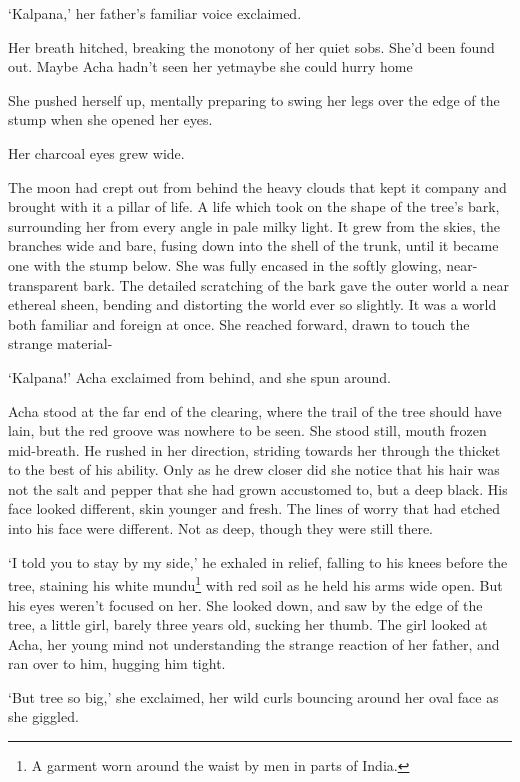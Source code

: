 `Kalpana,' her father's familiar voice exclaimed.

Her breath hitched, breaking the monotony of her quiet sobs. She'd
been found out. Maybe Acha hadn't seen her yet\textemdash maybe she
could hurry home\textemdash

She pushed herself up, mentally preparing to swing her legs over the
edge of the stump when she opened her eyes.

Her charcoal eyes grew wide.

The moon had crept out from behind the heavy clouds that kept it
company and brought with it a pillar of life. A life which took on the
shape of the tree's bark, surrounding her from every angle in pale
milky light. It grew from the skies, the branches wide and bare,
fusing down into the shell of the trunk, until it became one with the
stump below. She was fully encased in the softly glowing,
near-transparent bark. The detailed scratching of the bark gave the
outer world a near ethereal sheen, bending and distorting the world
ever so slightly. It was a world both familiar and foreign at
once. She reached forward, drawn to touch the strange material-

`Kalpana!' Acha exclaimed from behind, and she spun around.

Acha stood at the far end of the clearing, where the trail of the tree
should have lain, but the red groove was nowhere to be seen. She stood
still, mouth frozen mid-breath. He rushed in her direction, striding
towards her through the thicket to the best of his ability. Only as he
drew closer did she notice that his hair was not the salt and pepper
that she had grown accustomed to, but a deep black. His face looked
different, skin younger and fresh. The lines of worry that had etched
into his face were different. Not as deep, though they were still
there.

`I told you to stay by my side,' he exhaled in relief, falling to his
knees before the tree, staining his white mundu\footnote{A garment
  worn around the waist by men in parts of India.} with red soil as he
held his arms wide open. But his eyes weren't focused on her. She
looked down, and saw by the edge of the tree, a little girl, barely
three years old, sucking her thumb. The girl looked at Acha, her young
mind not understanding the strange reaction of her father, and ran
over to him, hugging him tight.

`But tree so big,' she exclaimed, her wild curls bouncing around her
oval face as she giggled.

